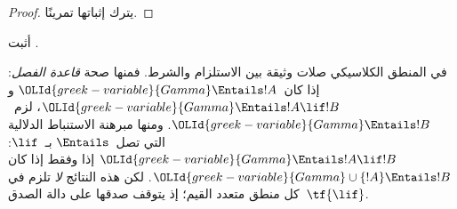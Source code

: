 \documentclass[../../../include/open-logic-section]{subfiles}
\begin{document}
\begin{proof}
يترك إثباتها تمرينًا.
\end{proof}

\begin{prob}
أثبت .
\end{prob}

في المنطق الكلاسيكي صلات وثيقة بين الاستلزام والشرط. فمنها صحة
\emph{قاعدة الفصل}: إذا كان~${\OLId{greek-variable}{Gamma}} \Entails !A$ و
${\OLId{greek-variable}{Gamma}} \Entails !A \lif !B$، لزم~${\OLId{greek-variable}{Gamma}} \Entails !B$.
ومنها مبرهنة الاستنباط الدلالية التي تصل~$\Entails$ بـ~$\lif$:
${\OLId{greek-variable}{Gamma}} \Entails !A \lif !B$ إذا وفقط إذا كان
${\OLId{greek-variable}{Gamma}} \cup \{!A\} \Entails !B$. لكن هذه النتائج \emph{لا} تلزم
في كل منطق متعدد القيم؛ إذ يتوقف صدقها على دالة الصدق~$\tf{\lif}$.
\end{document}
